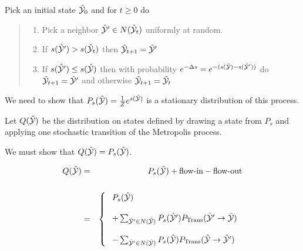 {

Pick an initial state $\hat{\cal Y}_0$ and for $t \geq 0$ do

\vfill
\begin{quotation}

    \noindent \begin{enumerate}
    \item Pick a neighbor $\hat{\cal Y}' \in N(\hat{\cal Y}_t)$ uniformly at random.

    \vfill      
    \item If $s(\hat{\cal Y}') > s(\hat{\cal Y}_t)$ then {\color{red} $\hat{\cal Y}_{t+1} = \hat{\cal Y}'$}

    \vfill      
    \item If $s(\hat{\cal Y}') \leq s(\hat{\cal Y})$ then with probability $e^{-\Delta s} = e^{-(s(\hat{\cal Y}) - s(\hat{\cal Y}'))}$
   do  {\color{red} $\hat{\cal Y}_{t+1} = \hat{\cal Y}'$} and otherwise {\color{red} $\hat{\cal Y}_{t+1} = \hat{\cal Y}_t$} 
  \end{enumerate}  
\end{quotation}

We need to show that $P_s(\hat{\cal Y}) = \frac{1}{Z}e^{s(\hat{\cal Y})}$ is a stationary distribution of this process.

\vfill
Let $Q(\hat{\cal Y})$ be the distribution on states defined by drawing a state from $P_s$ and applying one stochastic transition of the Metropolis process.

\vfill
We must show that $Q(\hat{\cal Y}) = P_s(\hat{\cal Y})$.


\begin{eqnarray*}
Q(\hat{\cal Y}) & = & P_s(\hat{\cal Y}) + \mbox{flow-in} - \mbox{flow-out} \\
\\
& = & \left\{\;\begin{array}{l} P_s(\hat{\cal Y}) \\
\\
+ \sum_{\hat{\cal Y}' \in N(\hat{\cal Y})} P_s(\hat{\cal Y}'){P_{\mathrm{Trans}}(\hat{\cal Y}' \rightarrow \hat{\cal Y})} \\
\\
- \sum_{\hat{\cal Y}' \in N(\hat{\cal Y})} P_s(\hat{\cal Y}){P_{\mathrm{Trans}}(\hat{\cal Y} \rightarrow \hat{\cal Y}')} \end{array} \right.
\end{eqnarray*}


}
